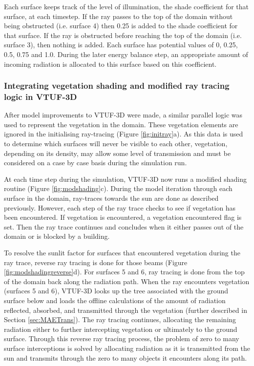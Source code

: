 \documentclass[final,3p,times,authoryear]{elsarticle}
\begin{document}
Each surface keeps track of the level of illumination, the shade coefficient for that surface, at each timestep. If the ray passes to the top of the domain without being obstructed (i.e. surface 4) then 0.25 is added to the shade coefficient for that surface. If the ray is obstructed before reaching the top of the domain (i.e. surface 3), then nothing is added. Each surface has potential values of 0, 0.25, 0.5, 0.75 and 1.0. During the later energy balance step, an appropriate amount of incoming radiation is allocated to this surface based on this coefficient.

\subsubsection{Integrating vegetation shading and modified ray tracing logic in VTUF-3D}\label{sec:Representationofvegetation}

After model improvements to VTUF-3D were made, a similar parallel logic was used to represent the vegetation in the domain. These vegetation elements are ignored in the initialising ray-tracing (Figure \ref{fig:initray}a). As this data is used to determine which surfaces will never be visible to each other, vegetation, depending on its density, may allow some level of transmission and must be considered on a case by case basis during the simulation run.

At each time step during the simulation, VTUF-3D now runs a modified shading routine (Figure \ref{fig:modshading}c). During the model iteration through each surface in the domain, ray-traces towards the sun are done as described previously. However, each step of the ray trace checks to see if vegetation has been encountered. If vegetation is encountered, a vegetation encountered flag is set. Then the ray trace continues and concludes when it either passes out of the domain or is blocked by a building. 

To resolve the sunlit factor for surfaces that encountered vegetation during the ray trace, reverse ray tracing is done for those beams (Figure \ref{fig:modshadingreverse}d). For surfaces 5 and 6, ray tracing is done from the top of the domain back along the radiation path. When the ray encounters vegetation (surfaces 5 and 6), VTUF-3D looks up the tree associated with the ground surface below and loads the offline calculations of the amount of radiation reflected, absorbed, and transmitted through the vegetation (further described in Section \ref{sec:MAETrans}). The ray tracing continues, allocating the remaining radiation either to further intercepting vegetation or ultimately to the ground surface. Through this reverse ray tracing process, the problem of zero to many surface interceptions is solved by allocating radiation as it is transmitted from the sun and transmits through the zero to many objects it encounters along its path. 
\end{document}
